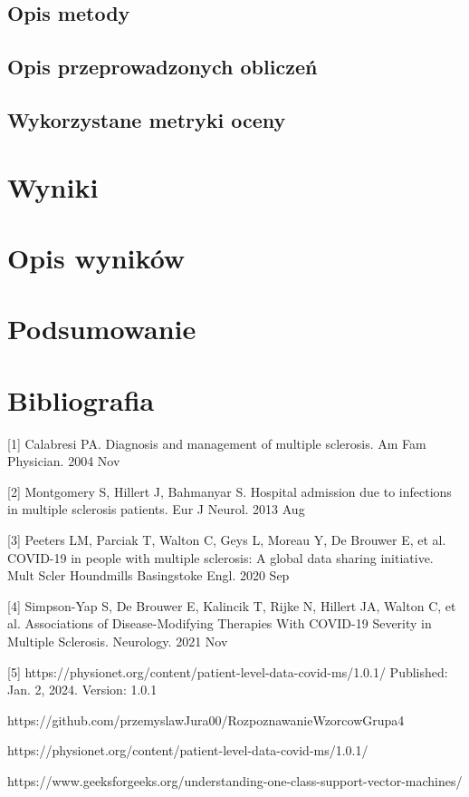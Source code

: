 \documentclass[a4paper,fleqn]{cas-dc}
\begin{document}
\subsection{Opis metody}

\subsection{Opis przeprowadzonych obliczeń}
\subsection{Wykorzystane metryki oceny}
\section{Wyniki}
\section{Opis wyników}
\section{Podsumowanie}


\section{Bibliografia}

[1] Calabresi PA. Diagnosis and management of multiple sclerosis. Am Fam Physician. 2004 Nov

[2] Montgomery S, Hillert J, Bahmanyar S. Hospital admission due to infections in multiple sclerosis patients. Eur J Neurol. 2013 Aug

[3] Peeters LM, Parciak T, Walton C, Geys L, Moreau Y, De Brouwer E, et al. COVID-19 in people with multiple sclerosis: A global data sharing initiative. Mult Scler Houndmills Basingstoke Engl. 2020 Sep

[4] Simpson-Yap S, De Brouwer E, Kalincik T, Rijke N, Hillert JA, Walton C, et al. Associations of Disease-Modifying Therapies With COVID-19 
Severity in Multiple Sclerosis. Neurology. 2021 Nov

[5] https://physionet.org/content/patient-level-data-covid-ms/1.0.1/  Published: Jan. 2, 2024. Version: 1.0.1

https://github.com/przemyslawJura00/RozpoznawanieWzorcowGrupa4

https://physionet.org/content/patient-level-data-covid-ms/1.0.1/

https://www.geeksforgeeks.org/understanding-one-class-support-vector-machines/
\end{document}
